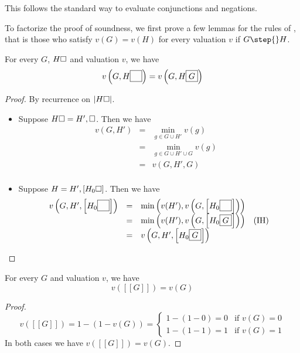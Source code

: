 \begin{scope}
This follows the standard way to evaluate conjunctions and negations.

To factorize the proof of soundness, we first prove a few lemmas for the
\emph{} rules of , that is those who satisfy $v(G) = v(H)$
for every valuation $v$ if $G \step{} H$.

\begin{lemma}[Iteration]
  For every  $G$,  $H\square$ and valuation $v$, we have
  $$v\left(G, H\fbox{$\phantom{G}$}\right) = v\left(G, H\fbox{$G$}\right)$$
\end{lemma}
\begin{proof}
  By recurrence on $\left|H\square\right|$.

  \def\arraystretch{1.5}
  \begin{itemize}
    \item[\bcase]
      Suppose $H\square = H', \square$. Then we have
      $$
      \begin{array}{rcll}
        v(G, H')
        &=& \min_{g \in G \cup H'}{v(g)} & \\
        &=& \min_{g \in G \cup H' \cup G}{v(g)} & \\
        &=& v(G, H', G) & \\
      \end{array}
      $$
    \item[\rcase]
      Suppose $H = H', [H_0\square]$. Then we have
      $$
      \begin{array}{rcll}
        v\left(G, H', \left[H_0\fbox{$\phantom{G}$}\right]\right)
        &=& \min\left(v(H'), v\left(G, \left[H_0\fbox{$\phantom{G}$}\right]\right)\right) & \\
        &=& \min\left(v(H'), v\left(G, \left[H_0\fbox{$G$}\right]\right)\right) &\text{(IH)} \\
        &=& v\left(G, H', \left[H_0\fbox{$G$}\right]\right) & \\
      \end{array}
      $$
  \end{itemize}
\end{proof}

\begin{lemma}
  For every  $G$ and valuation $v$, we have
  $$v([[G]]) = v(G)$$
\end{lemma}
\begin{proof}
  $$
  v([[G]]) = 1 - (1 - v(G)) = \begin{cases}
    1 - (1 - 0) = 0 &\text{if $v(G) = 0$} \\
    1 - (1 - 1) = 1 &\text{if $v(G) = 1$}
  \end{cases}
  $$
  In both cases we have $v([[G]]) = v(G)$.
\end{proof}


\end{scope}

